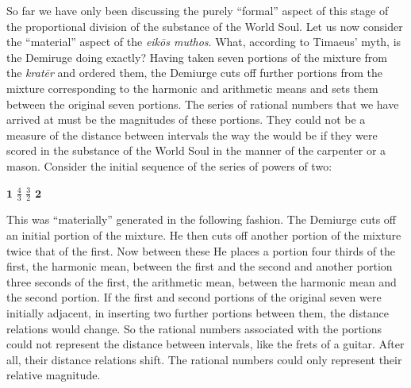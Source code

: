 So far we have only been discussing the purely ``formal'' aspect of this stage of the proportional division of the substance of the World Soul. Let us now consider the ``material'' aspect of the \emph{eikōs muthos}. What, according to Timaeus' myth, is the Demiruge doing exactly? Having taken seven portions of the mixture from the \emph{kratēr} and ordered them, the Demiurge cuts off further portions from the mixture corresponding to the harmonic and arithmetic means and sets them between the original seven portions. The series of rational numbers that we have arrived at must be the magnitudes of these portions. They could not be a measure of the distance between intervals the way the would be if they were scored in the substance of the World Soul in the manner of the carpenter or a mason. Consider the initial sequence of the series of powers of two:
\begin{center}
	\( \mathbf{1} \) \( \frac{4}{3} \) \( \frac{3}{2} \) \( \mathbf{2} \)
\end{center}
This was ``materially'' generated in the following fashion. The Demiurge cuts off an initial portion of the mixture. He then cuts off another portion of the mixture twice that of the first. Now between these He places a portion four thirds of the first, the harmonic mean, between the first and the second and another portion three seconds of the first, the arithmetic mean, between the harmonic mean and the second portion. If the first and second portions of the original seven were initially adjacent, in inserting two further portions between them, the distance relations would change. So the rational numbers associated with the portions could not represent the distance between intervals, like the frets of a guitar. After all, their distance relations shift. The rational numbers could only represent their relative magnitude.

